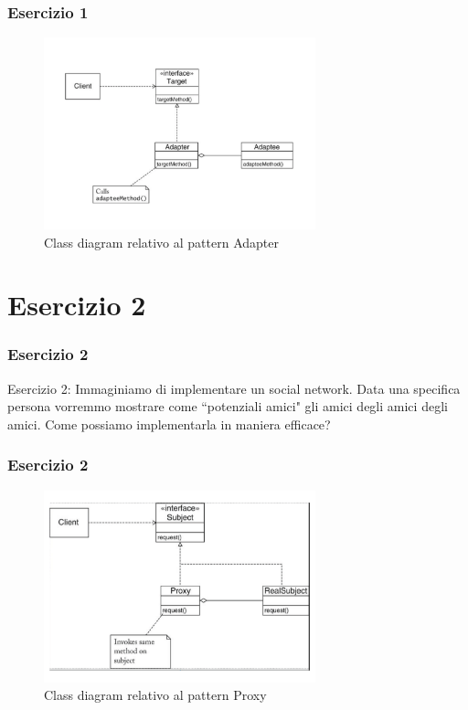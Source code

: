 \documentclass{beamer}
\begin{document}
\begin{frame}
\frametitle{Esercizio 1}
\begin{figure}
\centering
\includegraphics[width=0.7\textwidth]{Img/Adapter.pdf}
\caption{Class diagram relativo al pattern Adapter}
\label{Fig:FactoryAdapterConcepts}
\end{figure}
\end{frame}


\section{Esercizio 2}
\begin{frame}
\frametitle{Esercizio 2}
Esercizio 2: Immaginiamo di implementare un social network. Data una specifica persona vorremmo mostrare come ``potenziali amici" gli  amici degli amici degli amici. Come possiamo implementarla in maniera efficace?
\end{frame}

\begin{frame}
\frametitle{Esercizio 2}
\begin{figure}
\centering
\includegraphics[width=0.7\textwidth]{Img/Proxy.pdf}
\caption{Class diagram relativo al pattern Proxy}
\label{Fig:ProxyAdapterConcepts}
\end{figure}
\end{frame}
\end{document}
